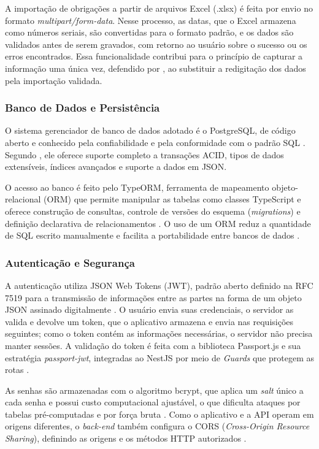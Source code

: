 A importação de obrigações a partir de arquivos Excel (.xlsx) é feita por envio no formato \textit{multipart/\allowbreak form-data}. Nesse processo, as datas, que o Excel armazena como números seriais, são convertidas para o formato padrão, e os dados são validados antes de serem gravados, com retorno ao usuário sobre o sucesso ou os erros encontrados. Essa funcionalidade contribui para o princípio de capturar a informação uma única vez, defendido por \citet{hammer1990}, ao substituir a redigitação dos dados pela importação validada.

\subsubsection{Banco de Dados e Persistência}

O sistema gerenciador de banco de dados adotado é o PostgreSQL, de código aberto e conhecido pela confiabilidade e pela conformidade com o padrão SQL \citep{postgresql2023}. Segundo \citet{obe2017}, ele oferece suporte completo a transações ACID, tipos de dados extensíveis, índices avançados e suporte a dados em JSON.

O acesso ao banco é feito pelo TypeORM, ferramenta de mapeamento objeto-relacional (ORM) que permite manipular as tabelas como classes TypeScript e oferece construção de consultas, controle de versões do esquema (\textit{migrations}) e definição declarativa de relacionamentos \citep{typeorm2023}. O uso de um ORM reduz a quantidade de SQL escrito manualmente e facilita a portabilidade entre bancos de dados \citep{ambler2003}.

\subsubsection{Autenticação e Segurança}

A autenticação utiliza JSON Web Tokens (JWT), padrão aberto definido na RFC 7519 para a transmissão de informações entre as partes na forma de um objeto JSON assinado digitalmente \citep{jones2015}. O usuário envia suas credenciais, o servidor as valida e devolve um token, que o aplicativo armazena e envia nas requisições seguintes; como o token contém as informações necessárias, o servidor não precisa manter sessões. A validação do token é feita com a biblioteca Passport.js e sua estratégia \textit{passport-jwt}, integradas ao NestJS por meio de \textit{Guards} que protegem as rotas \citep{passport2023}.

As senhas são armazenadas com o algoritmo bcrypt, que aplica um \textit{salt} único a cada senha e possui custo computacional ajustável, o que dificulta ataques por tabelas pré-computadas e por força bruta \citep{provos1999}. Como o aplicativo e a API operam em origens diferentes, o \textit{back-end} também configura o CORS (\textit{Cross-Origin Resource Sharing}), definindo as origens e os métodos HTTP autorizados \citep{w3c2014}.


